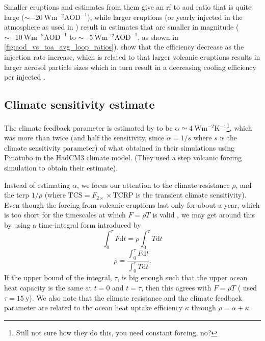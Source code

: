 \documentclass{ametsocV6.1}
\newcommand{\iso}[1][i]{{#1}njected \ce{SO2}}
\begin{document}
Smaller eruptions and estimates from them give an \gls{rf} to \gls{aod} ratio that is
quite large (\(\sim \SI{-20}{\watt\metre^{-2}\mathrm{AOD}^{-1}}\)), while larger
eruptions (or yearly \iso{} in the atmosphere as used in \citet{niemeier2015}) result in
estimates that are smaller in magnitude (\(\sim
\SI{-10}{\watt\metre^{-2}\mathrm{AOD}^{-1}}\) to \(\sim
\SI{-5}{\watt\metre^{-2}\mathrm{AOD}^{-1}}\), as shown in
\ref{fig:aod_vs_toa_avg_loop_ratios}). \citet{niemeier2017} show that the efficiency
decrease as the injection rate increase, which is related to
that larger volcanic eruptions results in larger aerosol particle sizes which in turn
result in a decreasing cooling efficiency per \iso{} \citep{english2013, timmreck2018}.

\subsection{Climate sensitivity estimate}


The climate feedback parameter is estimated by \citet{jones2005} to be \(\alpha \simeq
\SI{4}{\watt\metre^{-2}\kelvin^{-1}}\)\footnote{Still not sure how they do this, you
  need constant forcing, no?}, which was more than twice (and half the sensitivity, since
\(\alpha =1/s\) where \(s\) is the climate sensitivity parameter) of what
\citet{gregory2016} obtained in their simulations using Pinatubo in the HadCM3 climate
model. (They used a step volcanic forcing simulation to obtain their estimate).

Instead of estimating \(\alpha \), we focus our attention to the climate resistance
\(\rho \), and the \gls{tcrp} \(1/\rho\) (where \(\mathrm{TCS}=F_{2\times}\times
\mathrm{TCRP}\) is the transient climate sensitivity). Even though the forcing from
volcanic eruptions last only for about a year, which is too short for the timescales at
which \(F=\rho T\) is valid \citep{gregory2016}, we may get around this by using a
time-integral form introduced by \citet{merlis2014}
\begin{equation}
  \int_0^{\tau}F \mathrm{d}t=\rho\int_{0}^{\tau}T \mathrm{d}t
\end{equation}
\begin{equation}
  \rho=\frac{\int_0^{\tau}F \mathrm{d}t}{\int_{0}^{\tau}T \mathrm{d}t}.
  \label{eq:climate-resistance}
\end{equation}
%
If the upper bound of the integral, \(\tau \), is big enough such that the upper ocean
heat capacity is the same at \(t=0\) and \(t=\tau \), then this agrees with \(F=\rho T\)
\citep{gregory2016} (\citet{merlis2014} used \(\tau =\SI{15}{\mathrm{y}}\)). We also
note that the climate resistance and the climate feedback parameter are related to the
ocean heat uptake efficiency \(\kappa \) through \(\rho =\alpha +\kappa \).
\end{document}
